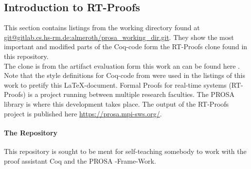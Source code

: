 

\subsection{Introduction to RT-Proofs}
This section contains listings from the working directory found at \url{git@gitlab.cs.hs-rm.de:almeroth/prosa_working_dir.git}.
They show the most important and modified parts of the Coq-code form the RT-Proofs clone found in this repository.\\
The clone is from the artifact evaluation form this work \cite{PROSA_schedubility_analysis} an can be found here \cite{PROSA_ECRTS_Artifact}.
Note that the style definitions for Coq-code from \cite{CoqStyleListing} were used in the listings of this work to pretify this {\LaTeX}-document.
Formal Proofs for real-time systems (RT-Proofs) is a project running between multiple research faculties.
The PROSA library is where this development takes place. The output of the RT-Proofs project  is published here \url{https://prosa.mpi-sws.org/}.



\paragraph{The Repository}

This repository is sought to be ment for self-teaching somebody to work with the proof assistant Coq and the PROSA -Frame-Work.



